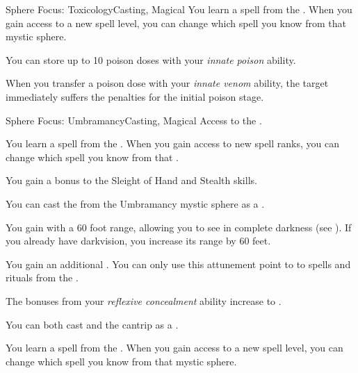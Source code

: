 \begin{feat}{Sphere Focus: Toxicology}{Casting, Magical}
         You learn a spell from the  .
        When you gain access to a new spell level, you can change which spell you know from that mystic sphere.

         You can store up to 10 poison doses with your \textit{innate poison} ability.

         When you transfer a poison dose with your \textit{innate venom} ability, the target immediately suffers the penalties for the initial poison stage.
    \end{feat}

    \begin{feat}{Sphere Focus: Umbramancy}{Casting, Magical}
        \featpre Access to the  .

         You learn a spell from the  .
        When you gain access to new spell ranks, you can change which spell you know from that .

         You gain a  bonus to the Sleight of Hand and Stealth skills.

         You can cast the   from the Umbramancy mystic sphere as a .

         You gain  with a 60 foot range, allowing you to see in complete darkness (see ).
        If you already have darkvision, you increase its range by 60 feet.

         You gain an additional .
        You can only use this attunement point to  to spells and rituals from the  .

         The bonuses from your \textit{reflexive concealment} ability increase to .

         You can both cast and  the  cantrip as a .

         You learn a spell from the  .
        When you gain access to a new spell level, you can change which spell you know from that mystic sphere.


\end{feat}
